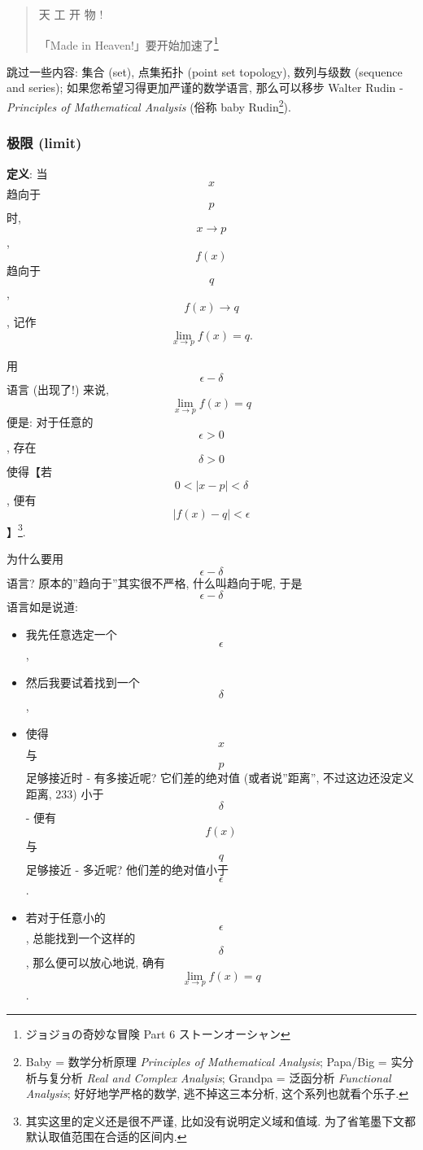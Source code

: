 \begin{quote}
天 工 开 物 !

「Made in Heaven!」要开始加速了\footnote{ジョジョの奇妙な冒険 Part 6
  ストーンオーシャン}
\end{quote}

跳过一些内容: 集合 (set), 点集拓扑 (point set topology), 数列与级数
(sequence and series); 如果您希望习得更加严谨的数学语言, 那么可以移步
Walter Rudin - \emph{Principles of Mathematical Analysis} (俗称 baby
Rudin\footnote{Baby = 数学分析原理 \emph{Principles of Mathematical
  Analysis}; Papa/Big = 实分析与复分析 \emph{Real and Complex Analysis};
  Grandpa = 泛函分析 \emph{Functional Analysis}; 好好地学严格的数学,
  逃不掉这三本分析, 这个系列也就看个乐子.}).

\hypertarget{ux6781ux9650-limit}{%
\subsubsection{极限 (limit)}\label{ux6781ux9650-limit}}

\textbf{定义}: 当 \[x\] 趋向于 \[p\] 时, \[x\rightarrow p\] , \[f(x)\]
趋向于 \[q\], \[f(x)\rightarrow q\] , 记作
\[\lim_{x\rightarrow p}f(x)=q.\]

用 \[\epsilon - \delta\] 语言 (出现了!) 来说,
\[\lim_{x\rightarrow p}f(x)=q\] 便是: 对于任意的 \[\epsilon>0\] , 存在
\[\delta>0\] 使得【若 \[0<|x-p|<\delta\], 便有 \[|f(x)-q|<\epsilon\]
】\footnote{其实这里的定义还是很不严谨, 比如没有说明定义域和值域.
  为了省笔墨下文都默认取值范围在合适的区间内.}.

为什么要用 \[\epsilon - \delta\] 语言? 原本的''趋向于''其实很不严格,
什么叫趋向于呢, 于是 \[\epsilon - \delta\] 语言如是说道:

\begin{itemize}
\tightlist
\item
  我先任意选定一个 \[\epsilon\],
\item
  然后我要试着找到一个 \[\delta\],
\item
  使得 \[x\] 与 \[p\] 足够接近时 - 有多接近呢? 它们差的绝对值
  (或者说''距离'', 不过这边还没定义距离, 233) 小于 \[\delta\] - 便有
  \[f(x)\] 与 \[q\] 足够接近 - 多近呢? 他们差的绝对值小于 \[\epsilon\].
\item
  若对于任意小的 \[\epsilon\], 总能找到一个这样的 \[\delta\],
  那么便可以放心地说, 确有\[\lim_{x\rightarrow p}f(x)=q\].
\end{itemize}

